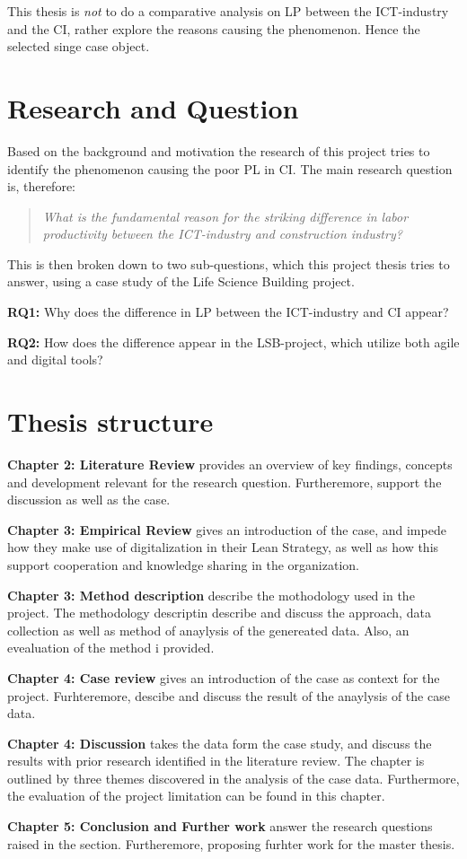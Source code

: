 This thesis is \textit{not} to do a comparative analysis on LP between the ICT-industry and the CI, rather explore the reasons causing the phenomenon. Hence the selected singe case object. 

\section{Research and Question} \label{sec:research}
Based on the background and motivation the research of this project tries to identify the phenomenon causing the poor PL in CI. The main research question is, therefore:
\begin{quote}
    \textit{What is the fundamental reason for the striking difference in labor productivity between the ICT-industry and construction industry?} 
\end{quote}
This is then broken down to two sub-questions, which this project thesis tries to answer, using a case study of the Life Science Building project.

{\noindent \bf RQ1:} Why does the difference in LP between the ICT-industry and CI appear?

{\noindent \bf RQ2:} How does the difference appear in the LSB-project, which utilize both agile and digital tools?

\section{Thesis structure} \label{sec:thesis}

{\noindent \bf Chapter 2: Literature Review} provides an overview of key findings, concepts and development relevant for the research question. Furtheremore, support the discussion as well as the case. 

{\noindent \bf Chapter 3: Empirical Review} gives an introduction of the case, and impede how they make use of digitalization in their Lean Strategy, as well as how this support cooperation and knowledge sharing in the organization.

{\noindent \bf Chapter 3: Method description} describe the mothodology used in the project. The methodology descriptin describe and discuss the approach, data collection as well as method of anaylysis of the genereated data. Also, an evealuation of the method i provided.

{\noindent \bf Chapter 4: Case review} gives an introduction of the case as context for the project. Furhteremore, descibe and discuss the result of the anaylysis of the case data. 

{\noindent \bf Chapter 4: Discussion} takes the data form the case study, and discuss the results with prior research identified in the literature review. The chapter is outlined by three themes discovered in the analysis of the case data. Furthermore, the evaluation of the project limitation can be found in this chapter.

{\noindent \bf Chapter 5: Conclusion and Further work} answer the research questions raised in the  section. Furtheremore, proposing furhter work for the master thesis.


\cleardoublepage